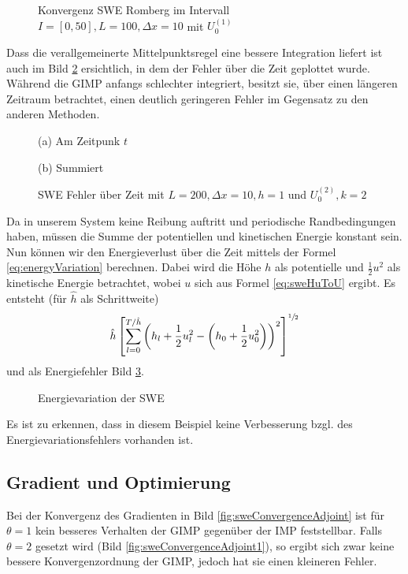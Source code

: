 \begin{figure}
\centering

\caption{Konvergenz SWE Romberg im Intervall $I = [0,50], L=100, \Delta x=10$ mit $U_0^{(1)}$}
\label{fig:sweConvergenceRomberg}
\end{figure}
Dass die verallgemeinerte Mittelpunktsregel eine bessere Integration liefert ist auch im Bild \ref{fig:sweErrorOverTime} ersichtlich, in dem der Fehler über die Zeit geplottet wurde. Während die GIMP anfangs schlechter integriert, besitzt sie, über einen längeren Zeitraum betrachtet, einen deutlich geringeren Fehler im Gegensatz zu den anderen Methoden.

\begin{figure}
\footnotesize
\begin{minipage}[b]{0.49\linewidth}
\centering

\caption*{(a) Am Zeitpunk $t$}
\end{minipage}
\begin{minipage}[b]{0.49\linewidth}
\centering

\caption*{(b) Summiert}
\end{minipage}
\caption{SWE Fehler über Zeit mit $L=200,\Delta x=10,h = 1$ und $U_0^{(2)},k=2$}
\label{fig:sweErrorOverTime}
\end{figure}
Da in unserem System keine Reibung auftritt und periodische Randbedingungen haben, müssen die Summe der potentiellen und kinetischen Energie konstant sein. Nun können wir den Energieverlust über die Zeit mittels der Formel \eqref{eq:energyVariation} berechnen. Dabei wird die Höhe $h$ als potentielle und $\frac{1}{2}u^2$ als kinetische Energie betrachtet, wobei $u$ sich aus Formel \eqref{eq:sweHuToU} ergibt. Es entsteht (für $\hat h$ als Schrittweite)
\[
 \hat h \left[\sum_{l=0}^{T/\hat h} \left( h_l + \frac{1}{2} u_l^2 - \left(h_0 + \frac{1}{2} u_0^2\right)\right)^2\right]^{\sfrac{1}{2}}
\]
und als Energiefehler Bild \ref{fig:sweEnergyVariation}.
\begin{figure}
\centering

\caption{Energievariation der SWE}
\label{fig:sweEnergyVariation}
\end{figure}
Es ist zu erkennen, dass in diesem Beispiel keine Verbesserung bzgl. des Energievariationsfehlers vorhanden ist.
\subsection{Gradient und Optimierung}
Bei der Konvergenz des Gradienten in Bild \ref{fig:sweConvergenceAdjoint} ist für $\theta=1$ kein besseres Verhalten der GIMP gegenüber der IMP feststellbar. Falls $\theta=2$ gesetzt wird (Bild \ref{fig:sweConvergenceAdjoint1}), so ergibt sich zwar keine bessere Konvergenzordnung der GIMP, jedoch hat sie einen kleineren Fehler.

